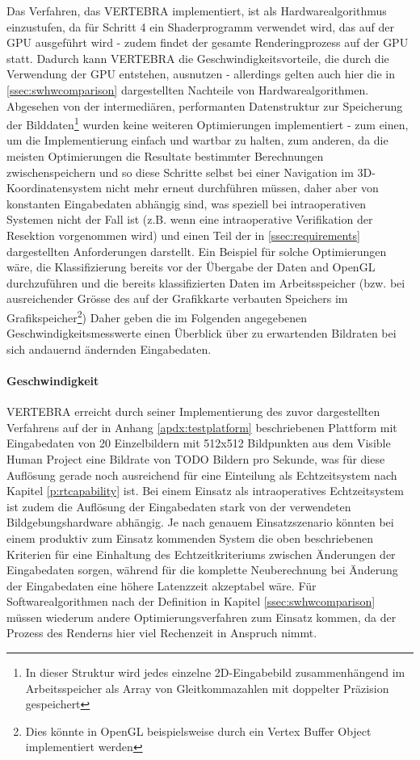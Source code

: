 \documentclass[pdftex,a4paper,titlepage,12pt]{scrartcl}
\newtheorem[L]{boxedDefinition}{Definition}
\begin{document}
Das Verfahren, das VERTEBRA implementiert, ist als Hardwarealgorithmus einzustufen, da für Schritt 4 ein Shaderprogramm verwendet wird, das auf der GPU ausgeführt wird - zudem findet der gesamte Renderingprozess auf der GPU statt. Dadurch kann VERTEBRA die Geschwindigkeitsvorteile, die durch die Verwendung der GPU entstehen, ausnutzen - allerdings gelten auch hier die in \vref{ssec:swhwcomparison} dargestellten Nachteile von Hardwarealgorithmen. Abgesehen von der intermediären, performanten Datenstruktur zur Speicherung der Bilddaten\footnote{In dieser Struktur wird jedes einzelne 2D-Eingabebild zusammenhängend im Arbeitsspeicher als Array von Gleitkommazahlen mit doppelter Präzision gespeichert} wurden keine weiteren Optimierungen implementiert - zum einen, um die Implementierung einfach und wartbar zu halten, zum anderen, da die meisten Optimierungen die Resultate bestimmter Berechnungen zwischenspeichern und so diese Schritte selbst bei einer Navigation im 3D-Koordinatensystem nicht mehr erneut durchführen müssen, daher aber von konstanten Eingabedaten abhängig sind, was speziell bei intraoperativen Systemen nicht der Fall ist (z.B. wenn eine intraoperative Verifikation der Resektion vorgenommen wird) und einen Teil der in \vref{ssec:requirements} dargestellten Anforderungen darstellt. Ein Beispiel für solche Optimierungen wäre, die Klassifizierung bereits vor der Übergabe der Daten and OpenGL durchzuführen und die bereits klassifizierten Daten im Arbeitsspeicher (bzw. bei ausreichender Grösse des auf der Grafikkarte verbauten Speichers im Grafikspeicher\footnote{Dies könnte in OpenGL beispielsweise durch ein Vertex Buffer Object implementiert werden}) Daher geben die im Folgenden angegebenen Geschwindigkeitsmesswerte einen Überblick über zu erwartenden Bildraten bei sich andauernd ändernden Eingabedaten.

\paragraph{Geschwindigkeit}
VERTEBRA erreicht durch seiner Implementierung des zuvor dargestellten Verfahrens auf der in Anhang \vref{apdx:testplatform} beschriebenen Plattform mit Eingabedaten von 20 Einzelbildern mit 512x512 Bildpunkten aus dem Visible Human Project eine Bildrate von TODO Bildern pro Sekunde, was für diese Auflösung gerade noch ausreichend für eine Einteilung als Echtzeitsystem nach Kapitel \vref{p:rtcapability} ist. Bei einem Einsatz als intraoperatives Echtzeitsystem ist zudem die Auflösung der Eingabedaten stark von der verwendeten Bildgebungshardware abhängig. Je nach genauem Einsatzszenario könnten bei einem produktiv zum Einsatz kommenden System die oben beschriebenen Kriterien für eine Einhaltung des Echtzeitkriteriums zwischen Änderungen der Eingabedaten sorgen, während für die komplette Neuberechnung bei Änderung der Eingabedaten eine höhere Latenzzeit akzeptabel wäre. Für Softwarealgorithmen nach der Definition in Kapitel \ref{ssec:swhwcomparison} müssen wiederum andere Optimierungsverfahren zum Einsatz kommen, da der Prozess des Renderns hier viel Rechenzeit in Anspruch nimmt.
\end{document}

